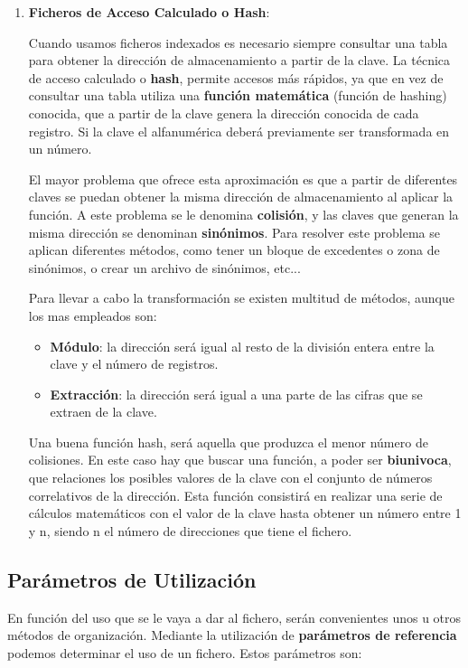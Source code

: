 \begin{enumerate}[label=(\alph*)]
    \item \textbf{Ficheros de Acceso Calculado o Hash}:

    Cuando usamos ficheros indexados es necesario siempre consultar una tabla para obtener la dirección de almacenamiento a partir de la clave. La técnica de acceso calculado o \textbf{hash}, permite accesos más rápidos, ya que en vez de consultar una tabla utiliza una \textbf{función matemática} (función de hashing) conocida, que a partir de la clave genera la dirección conocida de cada registro. Si la clave el alfanumérica deberá previamente ser transformada en un número.

    El mayor problema que ofrece esta aproximación es que a partir de diferentes claves se puedan obtener la misma dirección de almacenamiento al aplicar la función. A este problema se le denomina \textbf{colisión}, y las claves que generan la misma dirección se denominan \textbf{sinónimos}. Para resolver este problema se aplican diferentes métodos, como tener un bloque de excedentes o zona de sinónimos, o crear un archivo de sinónimos, etc...

    Para llevar a cabo la transformación se existen multitud de métodos, aunque los mas empleados son:

    \begin{itemize}
        \item \textbf{Módulo}: la dirección será igual al resto de la división entera entre la clave y el número de registros.
        \item \textbf{Extracción}: la dirección será igual a una parte de las cifras que se extraen de la clave.
    \end{itemize}

    Una buena función hash, será aquella que produzca el menor número de colisiones. En este caso hay que buscar una función, a poder ser \textbf{\gls{biunivoca}}, que relaciones los posibles valores de la clave con el conjunto de números correlativos de la dirección. Esta función consistirá en realizar una serie de cálculos matemáticos con el valor de la clave hasta obtener un número entre 1 y n, siendo n el número de direcciones que tiene el fichero.
\end{enumerate}

\subsection{Parámetros de Utilización}
En función del uso que se le vaya a dar al fichero, serán convenientes unos u otros métodos de organización. Mediante la utilización de \textbf{parámetros de referencia} podemos determinar el uso de un fichero. Estos parámetros son:


